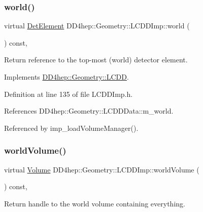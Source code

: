\subsubsection{\texorpdfstring{world()}{world()}}
{\footnotesize\ttfamily virtual \hyperlink{class_d_d4hep_1_1_geometry_1_1_det_element}{Det\+Element} D\+D4hep\+::\+Geometry\+::\+L\+C\+D\+D\+Imp\+::world (\begin{DoxyParamCaption}{ }\end{DoxyParamCaption}) const\hspace{0.3cm}{\ttfamily [inline]}, {\ttfamily [virtual]}}



Return reference to the top-\/most (world) detector element. 



Implements \hyperlink{class_d_d4hep_1_1_geometry_1_1_l_c_d_d_ae61d027023791272cf976432c0b3a977}{D\+D4hep\+::\+Geometry\+::\+L\+C\+DD}.



Definition at line 135 of file L\+C\+D\+D\+Imp.\+h.



References D\+D4hep\+::\+Geometry\+::\+L\+C\+D\+D\+Data\+::m\+\_\+world.



Referenced by imp\+\_\+load\+Volume\+Manager().

\hypertarget{class_d_d4hep_1_1_geometry_1_1_l_c_d_d_imp_ad066459dab51944a902249ceee84572d}{}\label{class_d_d4hep_1_1_geometry_1_1_l_c_d_d_imp_ad066459dab51944a902249ceee84572d} 
\subsubsection{\texorpdfstring{world\+Volume()}{worldVolume()}}
{\footnotesize\ttfamily virtual \hyperlink{class_d_d4hep_1_1_geometry_1_1_volume}{Volume} D\+D4hep\+::\+Geometry\+::\+L\+C\+D\+D\+Imp\+::world\+Volume (\begin{DoxyParamCaption}{ }\end{DoxyParamCaption}) const\hspace{0.3cm}{\ttfamily [inline]}, {\ttfamily [virtual]}}



Return handle to the world volume containing everything. 



